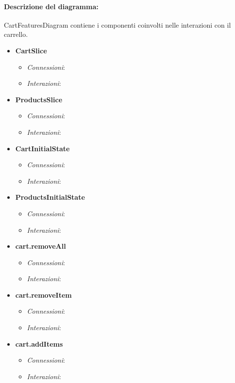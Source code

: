 \paragraph*{Descrizione del diagramma:}
CartFeaturesDiagram contiene i componenti coinvolti nelle interazioni con il carrello.
\begin{itemize}
		\item \textbf{CartSlice}
		\begin{itemize}
			\item \textit{Connessioni}: 
			\item \textit{Interazioni}:
		\end{itemize}
		\item \textbf{ProductsSlice}
		\begin{itemize}
			\item \textit{Connessioni}:
			\item \textit{Interazioni}:
		\end{itemize} 
		\item \textbf{CartInitialState}
		\begin{itemize}
			\item \textit{Connessioni}:
			\item \textit{Interazioni}:
		\end{itemize} 
		\item \textbf{ProductsInitialState}
		\begin{itemize}
			\item \textit{Connessioni}:
			\item \textit{Interazioni}:
		\end{itemize} 
		\item \textbf{cart.removeAll}
		\begin{itemize}
			\item \textit{Connessioni}:
			\item \textit{Interazioni}:
		\end{itemize} 
		\item \textbf{cart.removeItem}
		\begin{itemize}
			\item \textit{Connessioni}:
			\item \textit{Interazioni}:
		\end{itemize} 
		\item \textbf{cart.addItems}
		\begin{itemize}
			\item \textit{Connessioni}:
			\item \textit{Interazioni}:
		\end{itemize} 	

\end{itemize}
